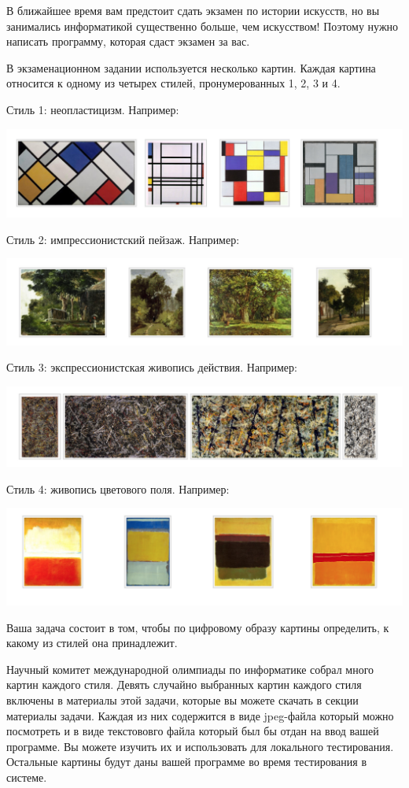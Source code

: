 В ближайшее время вам предстоит сдать экзамен по истории искусств, но вы
занимались информатикой существенно больше, чем искусством! Поэтому нужно
написать программу, которая сдаст экзамен за вас.

В экзаменационном задании используется несколько картин. Каждая картина
относится к одному из четырех стилей, пронумерованных 1, 2, 3 и 4.

Стиль 1: неопластицизм. Например:

\includegraphics[scale=0.8]{artclass1.png}

Стиль 2: импрессионистский пейзаж. Например:

\includegraphics[scale=0.8]{artclass2.png}

Стиль 3: экспрессионистская живопись действия. Например:

\includegraphics[scale=0.8]{artclass3.png}

Стиль 4: живопись цветового поля. Например:

\includegraphics[scale=0.8]{artclass4.png}

Ваша задача состоит в том, чтобы по цифровому образу картины определить, к
какому из стилей она принадлежит.

Научный комитет международной олимпиады по информатике собрал много картин
каждого стиля. Девять случайно выбранных картин каждого стиля включены в
материалы этой задачи, которые вы можете скачать в секции материалы задачи. Каждая из них содержится в виде jpeg-файла который можно посмотреть и в виде текстововго файла который был бы отдан на ввод вашей программе. Вы можете изучить их и использовать для локального тестирования. Остальные картины будут даны вашей
программе во время тестирования в системе.

